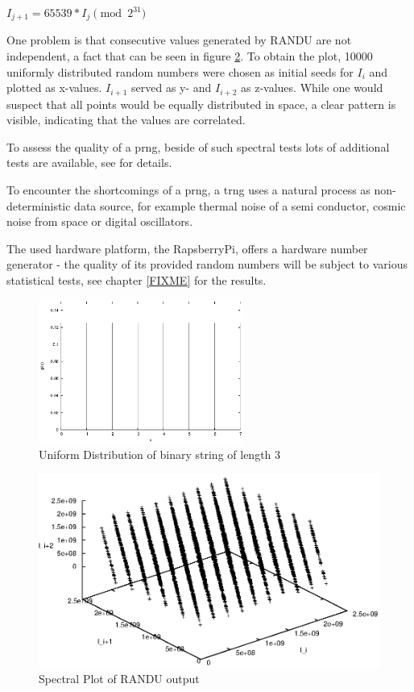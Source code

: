 \begin{center}
 $I_{j+1} = 65539 * I_j \pmod{2^{31}}$
\end{center}

One problem 
is that consecutive values generated by RANDU are not independent, a fact that	 can be seen in figure \ref{fig:randu}. To obtain the plot, 10000 uniformly distributed 
random numbers were chosen as initial seeds for $I_i$ and plotted as x-values. $I_{i+1}$ served as y- and $I_{i+2}$ as z-values. While one would suspect that all points
would be equally distributed in space, a clear pattern is visible, indicating that the values are correlated.

To assess the quality of a \gls{prng}, beside of such spectral tests lots of additional tests are available, see \cite{nistRAND} for details.

To encounter the shortcomings of a \gls{prng}, a \gls{trng} uses a natural process as non-deterministic data source, for example
thermal noise of a semi conductor, cosmic noise from space or digital oscillators.

The used hardware platform, the RapsberryPi, offers a hardware number generator - the quality of its provided random numbers will be subject
to various statistical tests, see chapter \ref{FIXME} for the results.

\begin{figure}
    \centering
    \includegraphics[width=0.6\textwidth]{figures/uniform}
    \caption{Uniform Distribution of binary string of length 3}
    \label{fig:uniform}
\end{figure}

\begin{figure}
    \centering
    \includegraphics[width=1\textwidth]{figures/randu}
    \caption{Spectral Plot of RANDU output}
    \label{fig:randu}
\end{figure}


